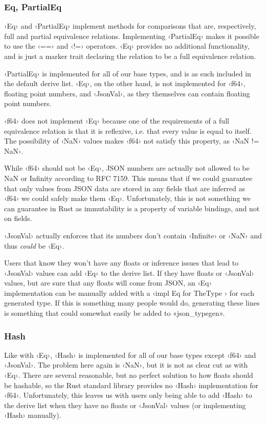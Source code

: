 \subsubsection{Eq, PartialEq}

‹Eq› and ‹PartialEq› implement methods for comparisons that are, respectively, full and partial equivalence relations. Implementing ‹PartialEq› makes it possible to use the ‹==› and ‹!=› operators. ‹Eq› provides no additional functionality, and is just a marker trait declaring the relation to be a full equivalence relation.

‹PartialEq› is implemented for all of our base types, and is as such included in the default derive list. ‹Eq›, on the other hand, is not implemented for ‹f64›, floating point numbers, and ‹JsonVal›, as they themselves can contain floating point numbers.

‹f64› does not implement ‹Eq› because one of the requirements of a full equivalence relation is that it is reflexive, i.e. that every value is equal to itself. The possibility of ‹NaN› values makes ‹f64› not satisfy this property, as ‹NaN != NaN›.

While ‹f64› should not be ‹Eq›, JSON numbers are actually not allowed to be NaN or Infinity according to RFC 7159\cite[7]{RFC7159}. This means that if we could guarantee that only values from JSON data are stored in any fields that are inferred as ‹f64› we could safely make them ‹Eq›. Unfortunately, this is not something we can guarantee in Rust as immutability is a property of variable bindings, and not on fields.

‹JsonVal› actually enforces that its numbers don't contain ‹Infinite› or ‹NaN› and thus \emph{could} be ‹Eq›.

Users that know they won't have any floats or inference issues that lead to ‹JsonVal› values can add ‹Eq› to the derive list. If they have floats or ‹JsonVal› values, but are sure that any floats will come from JSON, an ‹Eq› implementation can be manually added with a ‹impl Eq for TheType {}› for each generated type. If this is something many people would do, generating these lines is something that could somewhat easily be added to «json_typegen».

\subsubsection{Hash}

Like with ‹Eq›, ‹Hash› is implemented for all of our base types except ‹f64› and ‹JsonVal›. The problem here again is ‹NaN›, but it is not as clear cut as with ‹Eq›. There are several reasonable, but no perfect solution to how floats should be hashable, so the Rust standard library provides no ‹Hash› implementation for ‹f64›. Unfortunately, this leaves us with users only being able to add ‹Hash› to the derive list when they have no floats or ‹JsonVal› values (or implementing ‹Hash› manually).

